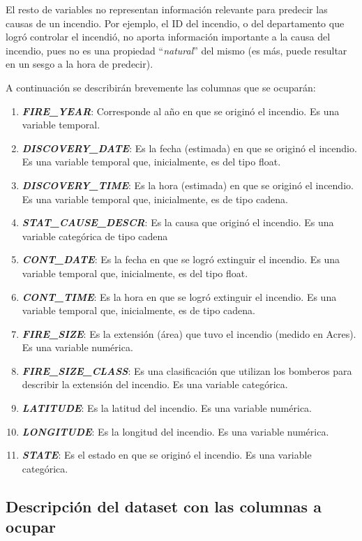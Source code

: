 El resto de variables no representan información relevante para predecir las causas de un incendio. Por ejemplo, el ID del incendio, o del departamento que logró controlar el incendió, no aporta información importante a la causa del incendio, pues no es una propiedad ``\textit{natural}'' del mismo (es más, puede resultar en un sesgo a la hora de predecir).

A continuación se describirán brevemente las columnas que se ocuparán:
\begin{enumerate}
    \item \textit{\textbf{FIRE\_YEAR}}: Corresponde al año en que se originó el incendio. Es una variable temporal.
    \item \textit{\textbf{DISCOVERY\_DATE}}: Es la fecha (estimada) en que se originó el incendio. Es una variable temporal que, inicialmente, es del tipo float.
    \item \textit{\textbf{DISCOVERY\_TIME}}: Es la hora (estimada) en que se originó el incendio. Es una variable temporal que, inicialmente, es de tipo cadena.
    \item \textit{\textbf{STAT\_CAUSE\_DESCR}}: Es la causa que originó el incendio. Es una variable categórica de tipo cadena
    \item \textit{\textbf{CONT\_DATE}}: Es la fecha en que se logró extinguir el incendio. Es una variable temporal que, inicialmente, es del tipo float.
    \item \textit{\textbf{CONT\_TIME}}: Es la hora en que se logró extinguir el incendio. Es una variable temporal que, inicialmente, es de tipo cadena.
    \item \textit{\textbf{FIRE\_SIZE}}: Es la extensión (área) que tuvo el incendio (medido en Acres). Es una variable numérica.
    \item \textit{\textbf{FIRE\_SIZE\_CLASS}}: Es una clasificación que utilizan los bomberos para describir la extensión del incendio. Es una variable categórica.
    \item \textit{\textbf{LATITUDE}}: Es la latitud del incendio. Es una variable numérica.
    \item \textit{\textbf{LONGITUDE}}: Es la longitud del incendio. Es una variable numérica.
    \item \textit{\textbf{STATE}}: Es el estado en que se originó el incendio. Es una variable categórica.
\end{enumerate}

\subsection{Descripción del dataset con las columnas a ocupar} \label{descr-dataset}

